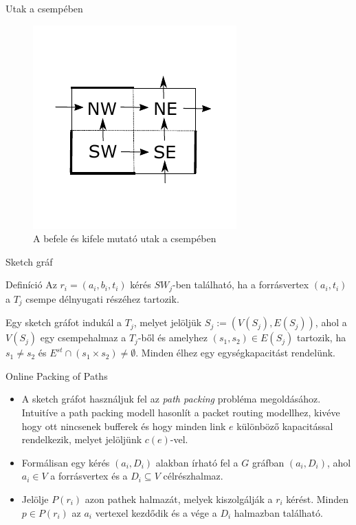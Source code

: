 \documentclass[10pt]{beamer}
\begin{document}
\begin{frame}{Utak a csempében}
	\begin{figure}
		\centering \includegraphics[width=0.55\columnwidth]{Image/tile}
		\caption{\label{fig:tile}A befele és kifele mutató utak a csempében}
	\end{figure}
\end{frame}

\begin{frame}{Sketch gráf}
  \begin{alertblock}{Definíció}
	Az $ r_i = (a_i, b_i, t_i) $ kérés $ SW_j $-ben található, ha a forrásvertex $ (a_i, t_i) $ a $ T_j $ csempe délnyugati részéhez tartozik.
  \end{alertblock}
  Egy sketch gráfot indukál a $ T_j $, melyet jelöljük $ S_j := (V(S_j), E(S_j)) $, ahol a $ V(S_j) $ egy csempehalmaz a $ T_j $-ből és amelyhez $ (s_1, s_2) \in E(S_j) $ tartozik, ha $ s_1 \neq s_2 $ és $ E^{st} \cap (s_1 \times s_2) \neq \emptyset $. Minden élhez egy egységkapacitást rendelünk.
\end{frame}

\begin{frame}{Online Packing of Paths}
  \begin{itemize}
  	\item A sketch gráfot használjuk fel az \textit{path packing} probléma megoldásához. Intuitíve a path packing modell hasonlít a packet routing modellhez, kivéve hogy ott nincsenek bufferek és hogy minden link $ e $ különböző kapacitással rendelkezik, melyet jelöljünk $ c(e) $-vel.
	\item Formálisan egy kérés $ (a_i, D_i) $ alakban írható fel a $ G $ gráfban $ (a_i, D_i) $, ahol $ a_i \in V $ a forrásvertex és a $ D_i \subseteq V $ célrészhalmaz.
    \item Jelölje $ P(r_i) $ azon pathek halmazát, melyek kiszolgálják a $ r_i $ kérést. Minden $ p \in P(r_i) $ az $ a_i $ vertexel kezdődik és a vége a $ D_i $ halmazban található.
  \end{itemize}
\end{frame}
\end{document}
